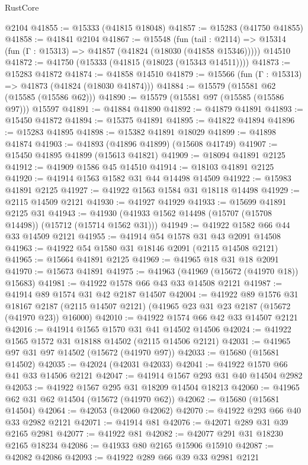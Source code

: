 \begin{lexlean}{RustCore}
\begin{coremodule}
    @2104
@41855 := @15333 (@41815 @18048)
@41857 := @15283 (@41750 @41855)
@41858 := @41841 @2104
@41867 := @15548
    (fun (tail : @2114) => @15314 (fun (Γ : @15313) => @41857 (@41824 (@18030 (@41858 @15346)))))
    @14510
@41872 := @41750 (@15333 (@41815 (@18023 (@15343 @14511))))
@41873 := @15283 @41872
@41874 := @41858 @14510
@41879 := @15566 (fun (Γ : @15313) => @41873 (@41824 (@18030 @41874)))
@41884 := @15579 (@15581 @62 (@15585 (@15586 @62)))
@41890 := @15579 (@15581 @97 (@15585 (@15586 @97))) @15597
@41891 := @41884 @41890
@41892 := @41879 @41891
@41893 := @15450 @41872
@41894 := @15375 @41891
@41895 := @41822 @41894
@41896 := @15283 @41895
@41898 := @15382 @41891 @18029
@41899 := @41898 @41874
@41903 := @41893 (@41896 @41899) (@15608 @41749)
@41907 := @15450 @41895 @41899 (@15613 @41821)
@41909 := @18094 @41891 @2125
@41912 := @41909 @1586 @45 @14510
@41914 := @18103 @41891 @2125
@41920 := @41914 @1563 @1582 @31 @44 @14498 @14509
@41922 := @15983 @41891 @2125
@41927 := @41922 @1563 @1584 @31 @18118 @14498
@41929 := @2115 @14509 @2121
@41930 := @41927 @41929
@41933 := @15699 @41891 @2125 @31
@41943 := @41930 (@41933 @1562 @14498 (@15707 (@15708 @14498)) (@15712 (@15714 @1562 @31)))
@41949 := @41922 @1582 @66 @44 @33 @14509 @2121
@41955 := @41914 @54 @1578 @31 @43 @2091 @14508
@41963 := @41922 @54 @1580 @31 @18146 @2091 (@2115 @14508 @2121)
@41965 := @15664 @41891 @2125
@41969 := @41965 @18 @31 @18 @2091
@41970 := @15673 @41891
@41975 := @41963 (@41969 (@15672 (@41970 @18)) @15683)
@41981 := @41922 @1578 @66 @43 @33 @14508 @2121
@41987 := @41914 @89 @1574 @31 @42 @2187 @14507
@42004 := @41922
    @89
    @1576
    @31
    @18167
    @2187
    (@2115 @14507 @2121)
    (@41965 @23 @31 @23 @2187 (@15672 (@41970 @23)) @16000)
@42010 := @41922 @1574 @66 @42 @33 @14507 @2121
@42016 := @41914 @1565 @1570 @31 @41 @14502 @14506
@42024 := @41922 @1565 @1572 @31 @18188 @14502 (@2115 @14506 @2121)
@42031 := @41965 @97 @31 @97 @14502 (@15672 (@41970 @97))
@42033 := @15680 (@15681 @14502)
@42035 := @42024 (@42031 @42033)
@42041 := @41922 @1570 @66 @41 @33 @14506 @2121
@42047 := @41914 @1567 @293 @31 @40 @14504 @2982
@42053 := @41922 @1567 @295 @31 @18209 @14504 @18213
@42060 := @41965 @62 @31 @62 @14504 (@15672 (@41970 @62))
@42062 := @15680 (@15681 @14504)
@42064 := @42053 (@42060 @42062)
@42070 := @41922 @293 @66 @40 @33 @2982 @2121
@42071 := @41914 @81
@42076 := @42071 @289 @31 @39 @2165 @2981
@42077 := @41922 @81
@42082 := @42077 @291 @31 @18230 @2165 @18234
@42086 := @41933 @80 @2165 @15906 @15910
@42087 := @42082 @42086
@42093 := @41922 @289 @66 @39 @33 @2981 @2121

\end{coremodule}
\end{lexlean}

